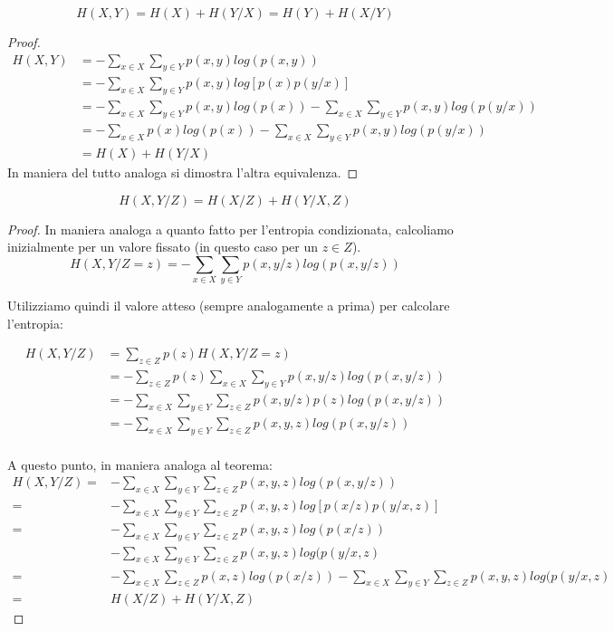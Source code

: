\begin{teorema}
 \[ H(X,Y)=H(X)+H(Y/X)=H(Y)+H(X/Y) \]
 \begin{proof}
  \[
   \begin{split}
    H(X,Y) &=  -\sum_{x \in X} \sum_{y \in Y} p(x,y) log(p(x,y))  \\
         &= -\sum_{x \in X} \sum_{y \in Y} p(x,y) log \left [p(x) p(y/x) \right] \\
         &= -\sum_{x \in X} \sum_{y \in Y} p(x,y)log(p(x)) - \sum_{x \in X} \sum_{y \in Y} p(x,y)log(p(y/x)) \\
         &= -\sum_{x \in X} p(x)log(p(x)) - \sum_{x \in X} \sum_{y \in Y} p(x,y)log(p(y/x)) \\
         &= H(X) + H(Y/X)
  \end{split}
  \]
  In maniera del tutto analoga si dimostra l'altra equivalenza.
 \end{proof}
\label{catena}
\end{teorema}

\begin{corollario}
\[
 H(X,Y/Z)=H(X/Z)+H(Y/X,Z)
\]
\begin{proof}
In maniera analoga a quanto fatto per l'entropia condizionata, calcoliamo inizialmente per un valore fissato 
(in questo caso per un $z \in Z$).
\[
 H(X,Y/Z=z)=-\sum_{x \in X} \sum_{y \in Y} p(x,y/z) log(p(x,y/z))
\]

\noindent
Utilizziamo quindi il valore atteso (sempre analogamente a prima) per calcolare l'entropia:

\[\begin{split}
 H(X,Y/Z)&=\sum_{z \in Z} p(z) H(X,Y/Z=z) \\
 &=-\sum_{z \in Z} p(z) \sum_{x \in X} \sum_{y \in Y} p(x,y/z) log(p(x,y/z)) \\
 &=-\sum_{x \in X} \sum_{y \in Y} \sum_{z \in Z} p(x,y/z) p(z) log(p(x,y/z)) \\ 
 &=-\sum_{x \in X} \sum_{y \in Y} \sum_{z \in Z} p(x,y,z) log(p(x,y/z)) \\
 \end{split}
\]

A questo punto, in maniera analoga al teorema:
\[\begin{split}
 H(X,Y/Z)=&-\sum_{x \in X} \sum_{y \in Y} \sum_{z \in Z} p(x,y,z) log(p(x,y/z)) \\
 =&-\sum_{x \in X} \sum_{y \in Y} \sum_{z \in Z} p(x,y,z) log[p(x/z) p(y/x,z)] \\
 =&-\sum_{x \in X} \sum_{y \in Y} \sum_{z \in Z} p(x,y,z) log(p(x/z)) \\
   &-\sum_{x \in X} \sum_{y \in Y} \sum_{z \in Z} p(x,y,z)log(p(y/x,z) \\
 =&-\sum_{x \in X} \sum_{z \in Z} p(x,z) log(p(x/z)) -\sum_{x \in X} \sum_{y \in Y} \sum_{z \in Z} p(x,y,z)log(p(y/x,z) \\
 =& H(X/Z)+H(Y/X,Z)
 \end{split}
\]
\end{proof}
\end{corollario}


